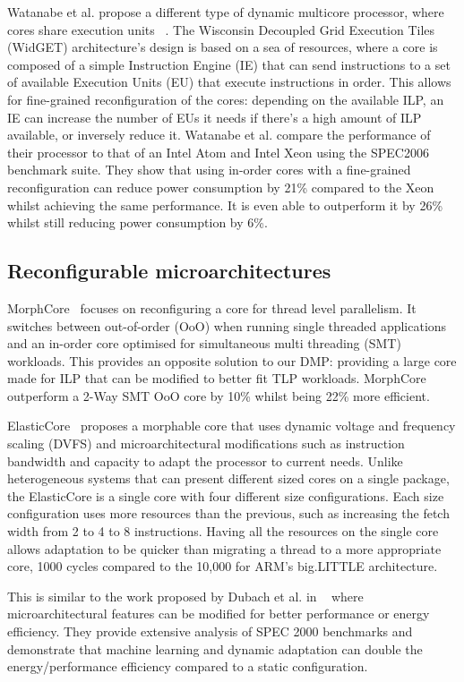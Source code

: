 Watanabe et al. propose a different type of dynamic multicore processor, where cores share execution units ~\cite{Watanabe2010Widget}.
The Wisconsin Decoupled Grid Execution Tiles (WidGET) architecture's design is based on a sea of resources, where a core is composed of a simple Instruction Engine (IE) that can send instructions to a set of available Execution Units (EU) that execute instructions in order.
This allows for fine-grained reconfiguration of the cores: depending on the available ILP, an IE can increase the number of EUs it needs if there's a high amount of ILP available, or inversely reduce it.
Watanabe et al. compare the performance of their processor to that of an Intel Atom and Intel Xeon using the SPEC2006 benchmark suite.
They show that using in-order cores with a fine-grained reconfiguration can reduce power consumption by 21\% compared to the Xeon whilst achieving the same performance.
It is even able to outperform it by 26\% whilst still reducing power consumption by 6\%.
 
\subsection{Reconfigurable microarchitectures}

MorphCore~\cite{khubaibMorphCore2012} focuses on reconfiguring a core for thread level parallelism.
It switches between out-of-order (OoO) when running single threaded applications and an in-order core optimised for simultaneous multi threading (SMT) workloads.
This provides an opposite solution to our DMP: providing a large core made for ILP that can be modified to better fit TLP workloads.
MorphCore outperform a 2-Way SMT OoO core by 10\% whilst being 22\% more efficient.

ElasticCore~\cite{tavanaElastic} proposes a morphable core that uses dynamic voltage and frequency scaling (DVFS) and microarchitectural modifications such as instruction bandwidth and capacity to adapt the processor to current needs.
Unlike heterogeneous systems that can present different sized cores on a single package, the ElasticCore is a single core with four different size configurations.
Each size configuration uses more resources than the previous, such as increasing the fetch width from 2 to 4 to 8 instructions.
Having all the resources on the single core allows adaptation to be quicker than migrating a thread to a  more appropriate core, 1000 cycles compared to the 10,000 for ARM's big.LITTLE architecture.

This is similar to the work proposed by Dubach et al. in ~\cite{dubach13dynamic} where microarchitectural features can be modified for better performance or energy efficiency.
They provide extensive analysis of SPEC 2000 benchmarks and demonstrate that machine learning and dynamic adaptation can double the energy/performance efficiency compared to a static configuration.


